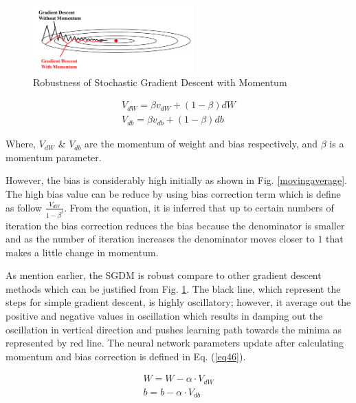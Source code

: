 \begin{figure}
    \centering
    \includegraphics[width=0.55\textwidth]{Images/SGDM.png}
    \caption{Robustness of Stochastic Gradient Descent with Momentum}
    \label{SGDM}
\end{figure} 

\begin{equation}
    \begin{array}{l}
    \label{eq45}
     V_{d W}=\beta v_{d W}+(1-\beta) d W \\
     V_{d b}=\beta v_{d b}+(1-\beta) d b
    \end{array}
\end{equation}

Where, $V_{d W}$ \& $V_{d b}$ are the momentum of weight and bias respectively, and $\beta$ is a momentum parameter.  

However, the bias is considerably high initially as shown in Fig. \ref{movingaverage}. The high bias value can be reduce by using bias correction term which is define as follow $\frac{V_{d W}}{1 - \beta^t}$. From the equation, it is inferred that up to certain numbers of iteration the bias correction reduces the bias because the denominator is smaller and as the number of iteration increases the denominator moves closer to $1$ that makes a little change in momentum. 

As mention earlier, the SGDM is robust compare to other gradient descent methods which can be justified from Fig. \ref{SGDM}. The black line, which represent the steps for simple gradient descent, is highly oscillatory; however, it average out the positive and negative values in oscillation which results in damping out the oscillation in vertical direction and pushes learning path towards the minima as represented by red line. The neural network parameters update after calculating momentum and bias correction is defined in Eq. (\ref{eq46}).  

\begin{equation}
    \begin{array}{l}
    \label{eq46}
     W=W-\alpha \cdot V_{d W} \\
     b=b-\alpha \cdot V_{d b}
    \end{array}
\end{equation}

